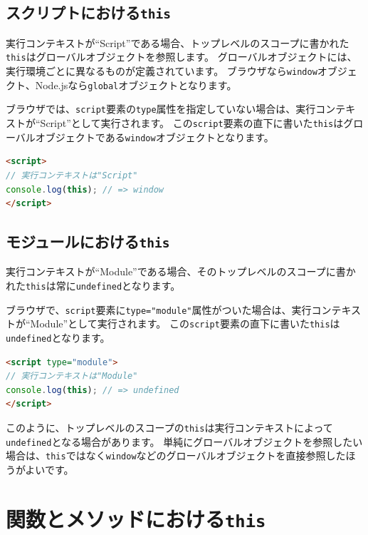 \hypertarget{script-this}{%
\subsection{\texorpdfstring{スクリプトにおける\texttt{this}}{スクリプトにおけるthis}}\label{script-this}}

実行コンテキストが``Script''である場合、トップレベルのスコープに書かれた\texttt{this}はグローバルオブジェクトを参照します。
グローバルオブジェクトには、実行環境ごとに異なるものが定義されています。
ブラウザなら\texttt{window}オブジェクト、Node.jsなら\texttt{global}オブジェクトとなります。

ブラウザでは、\texttt{script}要素の\texttt{type}属性を指定していない場合は、実行コンテキストが``Script''として実行されます。
この\texttt{script}要素の直下に書いた\texttt{this}はグローバルオブジェクトである\texttt{window}オブジェクトとなります。

\begin{lstlisting}[language=HTML]
<script>
// 実行コンテキストは"Script"
console.log(this); // => window
</script>
\end{lstlisting}

\hypertarget{module-this}{%
\subsection{\texorpdfstring{モジュールにおける\texttt{this}}{モジュールにおけるthis}}\label{module-this}}

実行コンテキストが``Module''である場合、そのトップレベルのスコープに書かれた\texttt{this}は常に\texttt{undefined}となります。

ブラウザで、\texttt{script}要素に\texttt{type="module"}属性がついた場合は、実行コンテキストが``Module''として実行されます。
この\texttt{script}要素の直下に書いた\texttt{this}は\texttt{undefined}となります。

\begin{lstlisting}[language=HTML]
<script type="module">
// 実行コンテキストは"Module"
console.log(this); // => undefined
</script>
\end{lstlisting}

このように、トップレベルのスコープの\texttt{this}は実行コンテキストによって\texttt{undefined}となる場合があります。
単純にグローバルオブジェクトを参照したい場合は、\texttt{this}ではなく\texttt{window}などのグローバルオブジェクトを直接参照したほうがよいです。

\hypertarget{function-and-method-this}{%
\section{\texorpdfstring{関数とメソッドにおける\texttt{this}}{関数とメソッドにおけるthis}}\label{function-and-method-this}}

